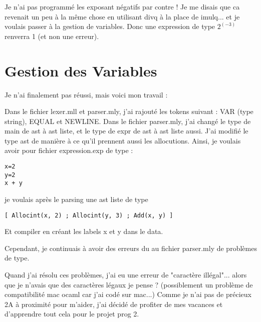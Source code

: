 \documentclass{article}
\begin{document}
Je n'ai pas programmé les exposant négatifs par contre ! Je me disais que ca revenait un peu à la même chose en utilisant divq à la place de imulq... et je voulais passer à la gestion de variables. Donc une expression de type $ 2 ^ (-3) $ renverra 1 (et non une erreur).

\section{Gestion des Variables}

Je n'ai finalement pas réussi, mais voici mon travail :


Dans le fichier lexer.mll et parser.mly, j'ai rajouté les tokens suivant : VAR (type string), EQUAL et NEWLINE. Dans le fichier parser.mly, j'ai changé le type de main de ast à ast liste, et le type de expr de ast à ast liste aussi. J'ai modifié le type ast de manière à ce qu'il prennent aussi les allocutions. Ainsi, je voulais avoir pour fichier expression.exp de type :

\begin{verbatim}
x=2
y=2
x + y
\end{verbatim}

je voulais après le parsing une ast liste de type

\begin{verbatim}
[ Allocint(x, 2) ; Allocint(y, 3) ; Add(x, y) ] 
\end{verbatim}

Et compiler en créant les labels x et y dans le data.


Cependant, je continuais à avoir des erreurs du au fichier parser.mly de problèmes de type.


Quand j'ai résolu ces problèmes, j'ai eu une erreur de "caractère illégal"... alors que je n'avais que des caractères légaux je pense ? (possiblement un problème de compatibilité mac ocaml car j'ai codé sur mac...) Comme je n'ai pas de précieux 2A à proximité pour m'aider, j'ai décidé de profiter de mes vacances et d'apprendre tout cela pour le projet prog 2.
\end{document}

